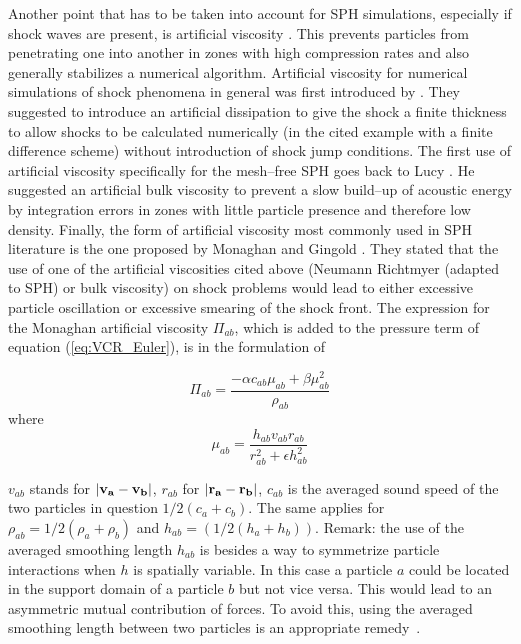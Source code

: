 \documentclass{report}
\begin{document}
Another point that has to be taken into account for SPH simulations, especially
if shock waves are present, is artificial viscosity \cite{Monaghan2005}. This
prevents particles from penetrating one into another in zones with high
compression rates and also generally stabilizes a numerical
algorithm.
Artificial viscosity for numerical simulations of shock phenomena
in general was first introduced by \cite{vonNeumann1950}. They suggested to
introduce an artificial dissipation to give the shock a finite thickness to 
allow shocks to be calculated numerically (in the cited example with a finite difference
scheme) without introduction of shock jump conditions.
The first use of artificial viscosity specifically for the mesh--free SPH goes
back to Lucy \cite{Lucy1977}. He suggested an artificial bulk viscosity to
prevent a slow build--up of acoustic energy by integration errors in zones with
little particle presence and therefore low density. 
Finally, the form of artificial viscosity most commonly used in SPH
literature \cite{Liu2003} is the one proposed by Monaghan and
Gingold \cite{Monaghan1983}. They stated that the use of one of the artificial
viscosities cited above (Neumann Richtmyer (adapted to SPH) or bulk
viscosity) on shock problems would lead to either excessive particle
oscillation or excessive smearing of the shock front. The expression for the Monaghan
artificial viscosity $\Pi_{ab}$, which is added to the pressure term of
equation (\ref{eq:VCR_Euler}), is in the formulation of \cite{Monaghan1992}

\begin{equation}
\label{eq:MonArtVis}
\Pi_{\mathit{ab}}= \frac{-\alpha c_{\mathit{ab}}\mu_{ab}+\beta \mu_{ab}^2}{\rho_{ab}}
\end{equation}
where 
\begin{equation}
\label{eq:FactArtVis}
\mu_{ab}=\frac{h_{ab}v_{ab}r_{ab}}{r_{ab}^2+\epsilon h_{ab}^2}
\end{equation}

$v_{ab}$ stands for $|{\bf v_a}-{\bf v_b}|$, $r_{ab}$ for $|{\bf r_a}-{\bf r_b}|$, $c_{ab}$ is the
averaged sound speed of the two particles in question $1/2(c_a+c_b)$. The same
applies for $\rho_{ab}=1/2(\rho_a+\rho_b)$ and $h_{ab}=(1/2(h_a+h_b))$. 
Remark: the use of
the averaged smoothing length $h_{ab}$ is besides a way to symmetrize particle
interactions when $h$ is spatially variable. In this case a particle $a$ could be
located in the support domain of a particle $b$ but not vice versa. This would
lead to an asymmetric mutual contribution of forces. To avoid this, using the
averaged smoothing length between two particles is an appropriate remedy~\cite{Liu2003}.
\end{document}
